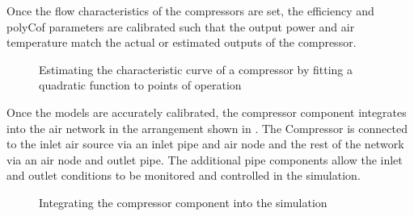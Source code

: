 		 Once the flow characteristics of the compressors are set, the efficiency and \gls{polyCof} parameters are calibrated such that the output power and air temperature match the actual or estimated outputs of the compressor.
		\par 
		\begin{figure}[h!]
			\centering
			\fbox{}
			\caption{Estimating the characteristic curve of a compressor by fitting a quadratic function to points of operation}
			\label{fig: Compressor Curve}
		\end{figure}
		Once the models are accurately calibrated, the compressor component integrates into the air network in the arrangement shown in . The Compressor is connected to the inlet air source via an inlet pipe and air node and the rest of the network via an air node and outlet pipe. The additional pipe components allow the inlet and outlet conditions to be monitored and controlled in the simulation.
		\begin{figure}[h]
			\centering
			\caption{Integrating the compressor component into the simulation}
			\label{fig: Compressor models}
		\end{figure}		

